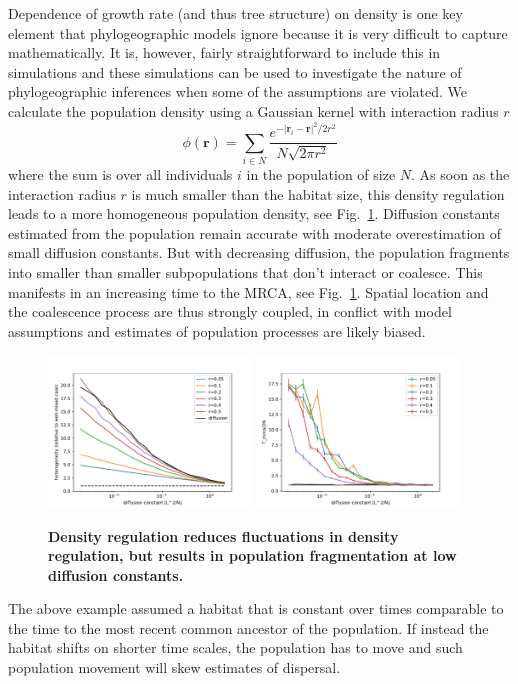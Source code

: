 \documentclass[aps,rmp, onecolumn]{revtex4}
\newcommand{\rvec}{\mathbf{r}}
\begin{document}
Dependence of growth rate (and thus tree structure) on density is one key element that phylogeographic models ignore because it is very difficult to capture mathematically.
It is, however, fairly straightforward to include this in simulations and these simulations can be used to investigate the nature of phylogeographic inferences when some of the assumptions are violated.
We calculate the population density using a Gaussian kernel with interaction radius $r$
\begin{equation}
    \phi(\rvec) = \sum_{i\in N} \frac{e^{-|\rvec_i - \rvec|^2/2r^2}}{N\sqrt{2\pi r^2}}
\end{equation}
where the sum is over all individuals $i$ in the population of size $N$.
As soon as the interaction radius $r$ is much smaller than the habitat size, this density regulation leads to a more homogeneous population density, see Fig.~\ref{fig:density_reg}.
Diffusion constants estimated from the population remain accurate with moderate overestimation of small diffusion constants.
But with decreasing diffusion, the population fragments into smaller than smaller subpopulations that don't interact or coalesce.
This manifests in an increasing time to the MRCA, see Fig.~\ref{fig:density_reg}.
Spatial location and the coalescence process are thus strongly coupled, in conflict with model assumptions and estimates of population processes are likely biased.

\begin{figure}
    \includegraphics[width=0.48\textwidth]{figures/density_reg_heterogeneity.pdf}
    \includegraphics[width=0.48\textwidth]{figures/density_reg_tmrca.pdf}
    \caption{\label{fig:density_reg} {\bf Density regulation reduces fluctuations in density regulation, but results in population fragmentation at low diffusion constants.}}
\end{figure}

The above example assumed a habitat that is constant over times comparable to the time to the most recent common ancestor of the population.
If instead the habitat shifts on shorter time scales, the population has to move and such population movement will skew estimates of dispersal.
\end{document}
